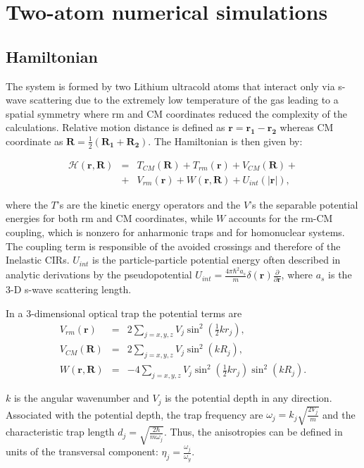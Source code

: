 \documentclass[aps,pre,twocolumn,superscriptaddress,showpacs]{revtex4-1}
\newcommand{\bfeq}[1]{{\boldsymbol{#1}}}
\begin{document}
\section{Two-atom numerical simulations}  \label{sec:system}
	\subsection{Hamiltonian}
		The system is formed by two Lithium ultracold atoms that interact only via s-wave scattering due to the extremely low temperature of the gas 			leading to a spatial symmetry where rm and CM coordinates reduced the complexity of the calculations. Relative motion distance is defined as			$\bfeq{r} = \bfeq{r_1} - \bfeq{r_2}$ whereas CM coordinate as $\bfeq{R} = \frac{1}{2}(\bfeq{R_1} + \bfeq{R_2})$. The Hamiltonian is then given by:
		
		\begin{eqnarray}
			\mathcal{H}(\bfeq{r}, \bfeq{R}) &=& T_{CM}(\bfeq{R}) + T_{rm}(\bfeq{r}) + V_{CM}(\bfeq{R}) + 				\nonumber \\ 
			 &+& V_{rm}(\bfeq{r}) + W(\bfeq{r}, \bfeq{R}) + U_{int}(|\bfeq{r}|), 
			 \label{eq:Hamiltonian}
		\end{eqnarray}
		
		where the $T$'s are the kinetic energy operators and the $V$'s the separable potential energies for both rm and CM coordinates, while $W$ 		accounts for the rm-CM coupling, which is nonzero for anharmonic traps and for homonuclear systems. The coupling term is responsible of 			the avoided crossings and therefore of the Inelastic CIRs. $U_{int}$ is the particle-particle potential energy often described in analytic derivations by 		the pseudopotential $U_{int} = \frac{4\pi \hbar^2 a_s}{m} \delta(\bfeq{r})\frac{\partial}{\partial \bfeq{r}}$, where $a_s$ is the 3-D s-wave scattering length.
		
		In a 3-dimensional optical trap the potential terms are
		\begin{eqnarray}
			V_{rm}(\bfeq{r}) &=& 2 \sum_{j=x,y,z} V_j \sin^2 \left(\frac{1}{2}k r_j \right), \\
			V_{CM}(\bfeq{R}) &=& 2 \sum_{j=x,y,z} V_j \sin^2 \left(k R_j \right), \\
			W(\bfeq{r}, \bfeq{R}) &=& -4 \sum_{j=x,y,z} V_j \sin^2 \left(\frac{1}{2}k r_j \right) \sin^2 \left(k R_j \right).
		\end{eqnarray}
		
		$k$ is the angular wavenumber and $V_j$ is the potential depth in any direction. Associated with the potential depth, the trap frequency are 			$\omega_j = k_j\sqrt{\frac{2V_j}{m}}$ and the characteristic trap length $d_j = \sqrt{\frac{2\hbar}{m\omega_j}}$. Thus, the anisotropies can be 			defined in units of the transversal component: $\eta_j = \frac{\omega_j}{\omega_y}$.
	
\end{document}
